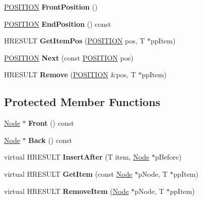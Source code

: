 \begin{DoxyCompactItemize}
\item 
\mbox{\label{class_list_aaeadf068cee7daef075e4a931b05c4d0}} 
\hyperlink{class_list_1_1_p_o_s_i_t_i_o_n}{P\+O\+S\+I\+T\+I\+ON} {\bfseries Front\+Position} ()
\item 
\mbox{\label{class_list_a5972e3639951c1cddc4232f24834c2d7}} 
\hyperlink{class_list_1_1_p_o_s_i_t_i_o_n}{P\+O\+S\+I\+T\+I\+ON} {\bfseries End\+Position} () const
\item 
\mbox{\label{class_list_a0d872057adc954136d59044d4924548f}} 
H\+R\+E\+S\+U\+LT {\bfseries Get\+Item\+Pos} (\hyperlink{class_list_1_1_p_o_s_i_t_i_o_n}{P\+O\+S\+I\+T\+I\+ON} pos, T $\ast$pp\+Item)
\item 
\mbox{\label{class_list_a7e909429843b9cb30466983d3aa04ce1}} 
\hyperlink{class_list_1_1_p_o_s_i_t_i_o_n}{P\+O\+S\+I\+T\+I\+ON} {\bfseries Next} (const \hyperlink{class_list_1_1_p_o_s_i_t_i_o_n}{P\+O\+S\+I\+T\+I\+ON} pos)
\item 
\mbox{\label{class_list_af5a23debb9fa1e4b08383549778f19a2}} 
H\+R\+E\+S\+U\+LT {\bfseries Remove} (\hyperlink{class_list_1_1_p_o_s_i_t_i_o_n}{P\+O\+S\+I\+T\+I\+ON} \&pos, T $\ast$pp\+Item)
\end{DoxyCompactItemize}
\subsection*{Protected Member Functions}
\begin{DoxyCompactItemize}
\item 
\mbox{\label{class_list_a63bd21000971a54bf7cdeb81acd2efd2}} 
\hyperlink{struct_list_1_1_node}{Node} $\ast$ {\bfseries Front} () const
\item 
\mbox{\label{class_list_a269177d67da39260c7c4615e89880fb0}} 
\hyperlink{struct_list_1_1_node}{Node} $\ast$ {\bfseries Back} () const
\item 
\mbox{\label{class_list_a99c060271f06161d25ffd6f8a26a0bac}} 
virtual H\+R\+E\+S\+U\+LT {\bfseries Insert\+After} (T item, \hyperlink{struct_list_1_1_node}{Node} $\ast$p\+Before)
\item 
\mbox{\label{class_list_a441f5e875d88faff3f1d6e7c3906c200}} 
virtual H\+R\+E\+S\+U\+LT {\bfseries Get\+Item} (const \hyperlink{struct_list_1_1_node}{Node} $\ast$p\+Node, T $\ast$pp\+Item)
\item 
\mbox{\label{class_list_a1d4df4987acf10d5330061902e19ccb5}} 
virtual H\+R\+E\+S\+U\+LT {\bfseries Remove\+Item} (\hyperlink{struct_list_1_1_node}{Node} $\ast$p\+Node, T $\ast$pp\+Item)
\end{DoxyCompactItemize}
